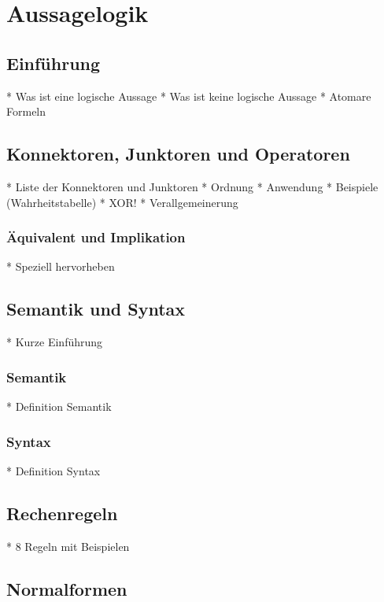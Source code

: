 \newpage

\section{Aussagelogik}

\subsection{Einführung}

* Was ist eine logische Aussage
* Was ist keine logische Aussage
* Atomare Formeln

\subsection{Konnektoren, Junktoren und Operatoren}

* Liste der Konnektoren und Junktoren
* Ordnung
* Anwendung
* Beispiele (Wahrheitstabelle)
* XOR!
* Verallgemeinerung

\subsubsection{Äquivalent und Implikation}

* Speziell hervorheben

\subsection{Semantik und Syntax}

* Kurze Einführung

\subsubsection{Semantik}

* Definition Semantik

\subsubsection{Syntax}

* Definition Syntax

\subsection{Rechenregeln}

* 8 Regeln mit Beispielen

\subsection{Normalformen}

